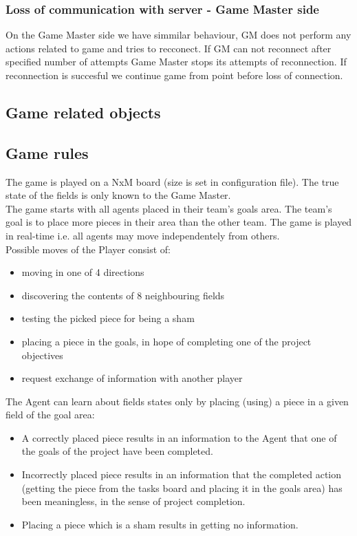 \documentclass[11pt,a4paper]{article}
\begin{document}
\subsubsection{Loss of communication with server - Game Master side}
On the Game Master side we have simmilar behaviour, GM does not perform any actions related to game and tries to recconect. If GM can not reconnect after specified number of attempts Game Master stops its attempts of reconnection. If reconnection is succesful we continue game from point before loss of connection.

\subsection{Game related objects}

\subsection{Game rules}

The game is played on a NxM board (size is set in configuration file). The true state of the fields is only known to the Game Master. \\
The game starts with all agents placed in their team's goals area. The team's goal is to place more pieces in their area than the other team. The game is played in real-time i.e. all agents may move independentely from others.\\
Possible moves of the Player consist of:
\begin{itemize}
\item moving in one of 4 directions
\item discovering the contents of 8 neighbouring fields
\item testing the picked piece for being a sham
\item placing a piece in the goals, in hope of completing one of the project objectives
\item request exchange of information with another player \\
\end{itemize}

The Agent can learn about fields states only by placing (using) a piece in a given field of the goal area:
\begin{itemize}


\item A correctly placed piece results in an information to the Agent that one
of the goals of the project have been completed.
\item Incorrectly placed piece results in an information that the completed action
(getting the piece from the tasks board and placing it in the goals
area) has been meaningless, in the sense of project completion.
\item Placing a piece which is a sham results in getting no information.
\end{itemize}
\end{document}
